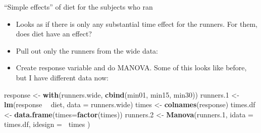 \documentclass[
  ignorenonframetext,
]{beamer}
\newenvironment{Shaded}{\begin{snugshade}}{\end{snugshade}}
\newcommand{\DataTypeTok}[1]{\textcolor[rgb]{0.13,0.29,0.53}{#1}}
\newcommand{\FloatTok}[1]{\textcolor[rgb]{0.00,0.00,0.81}{#1}}
\newcommand{\KeywordTok}[1]{\textcolor[rgb]{0.13,0.29,0.53}{\textbf{#1}}}
\newcommand{\NormalTok}[1]{#1}
\newcommand{\OperatorTok}[1]{\textcolor[rgb]{0.81,0.36,0.00}{\textbf{#1}}}
\newcommand{\StringTok}[1]{\textcolor[rgb]{0.31,0.60,0.02}{#1}}
\providecommand{\tightlist}{%
  \setlength{\itemsep}{0pt}\setlength{\parskip}{0pt}}
\begin{document}
\begin{frame}[fragile]{``Simple effects'' of diet for the subjects who
ran}
\protect\hypertarget{simple-effects-of-diet-for-the-subjects-who-ran}{}

\begin{itemize}
\item
  Looks as if there is only any substantial time effect for the runners.
  For them, does diet have an effect?
\item
  Pull out only the runners from the wide data:
\end{itemize}

\begin{Shaded}
\end{Shaded}

\begin{itemize}
\tightlist
\item
  Create response variable and do MANOVA. Some of this looks like
  before, but I have different data now:
\end{itemize}

\footnotesize

\begin{Shaded}
\begin{Highlighting}[]
\NormalTok{response <-}\StringTok{ }\KeywordTok{with}\NormalTok{(runners.wide, }\KeywordTok{cbind}\NormalTok{(min01, min15, min30))}
\NormalTok{runners}\FloatTok{.1}\NormalTok{ <-}\StringTok{ }\KeywordTok{lm}\NormalTok{(response }\OperatorTok{~}\StringTok{ }\NormalTok{diet, }\DataTypeTok{data =}\NormalTok{ runners.wide)}
\NormalTok{times <-}\StringTok{ }\KeywordTok{colnames}\NormalTok{(response)}
\NormalTok{times.df <-}\StringTok{ }\KeywordTok{data.frame}\NormalTok{(}\DataTypeTok{times=}\KeywordTok{factor}\NormalTok{(times))}
\NormalTok{runners}\FloatTok{.2}\NormalTok{ <-}\StringTok{ }\KeywordTok{Manova}\NormalTok{(runners}\FloatTok{.1}\NormalTok{,}
  \DataTypeTok{idata =}\NormalTok{ times.df,}
  \DataTypeTok{idesign =} \OperatorTok{~}\NormalTok{times}
\NormalTok{)}
\end{Highlighting}
\end{Shaded}

\normalsize

\end{frame}
\end{document}
